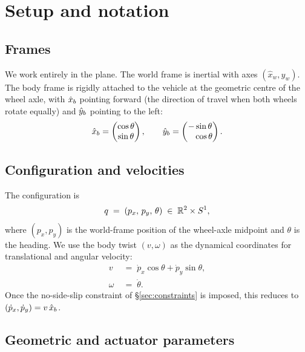 \section{Setup and notation}
\label{sec:setup}

\subsection{Frames}

We work entirely in the plane. The world frame is inertial with axes
$(\hat{x}_w, \hat{y}_w)$. The body frame is rigidly attached to the vehicle
at the geometric centre of the wheel axle, with $\hat{x}_{b}$ pointing forward
(the direction of travel when both wheels rotate equally) and $\hat{y}_{b}$
pointing to the left:
\begin{equation}
    \hat{x}_{b} = \begin{pmatrix}\cos\theta \\ \sin\theta\end{pmatrix},
    \qquad
    \hat{y}_{b} = \begin{pmatrix}-\sin\theta \\ \phantom{-}\cos\theta\end{pmatrix}.
    \label{eq:body-axes}
\end{equation}

\subsection{Configuration and velocities}

The configuration is
\begin{equation}
    q \;=\; (p_x,\, p_y,\, \theta) \;\in\; \mathbb{R}^{2} \times S^{1},
\end{equation}
where $(p_x, p_y)$ is the world-frame position of the wheel-axle midpoint
and $\theta$ is the heading. We use the body twist $(v, \omega)$ as the
dynamical coordinates for translational and angular velocity:
\begin{align}
    v       &\;=\; \dot p_x \cos\theta + \dot p_y \sin\theta, \\
    \omega   &\;=\; \dot\theta.
\end{align}
Once the no-side-slip constraint of \S\ref{sec:constraints} is imposed,
this reduces to $(\dot p_x, \dot p_y) = v\,\hat{x}_{b}$.

\subsection{Geometric and actuator parameters}

